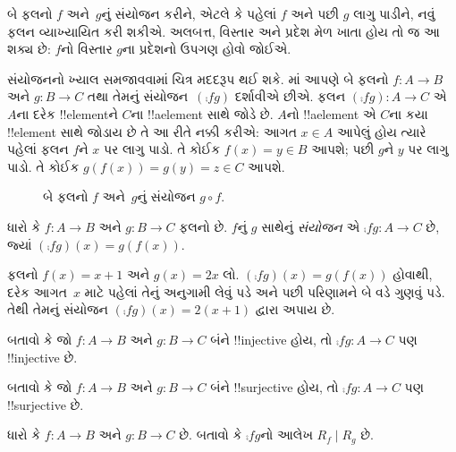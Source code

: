 \documentclass[../../../include/open-logic-section]{subfiles}
\begin{document}

\begin{explain}
 બે ફલનો $f$ અને~$g$નું સંયોજન કરીને,
એટલે કે પહેલાં $f$ અને પછી $g$ લાગુ પાડીને, નવું ફલન
વ્યાખ્યાયિત કરી શકીએ. અલબત્ત, વિસ્તાર અને પ્રદેશ મેળ ખાતા
હોય તો જ આ શક્ય છે: $f$નો વિસ્તાર $g$ના પ્રદેશનો
ઉપગણ હોવો જોઈએ. 

સંયોજનનો ખ્યાલ સમજાવવામાં ચિત્ર મદદરૂપ થઈ શકે.
માં આપણે બે ફલનો
$f \colon A \to B$ અને $g \colon B \to C$
તથા તેમનું સંયોજન~$(\comp{f}{g})$ દર્શાવીએ છીએ.
ફલન $(\comp{f}{g}) \colon A \to C$ એ $A$ના દરેક
!!{element}ને $C$ના !!a{element} સાથે જોડે છે.
$A$નો !!a{element} એ $C$ના કયા !!{element}
સાથે જોડાય છે તે આ રીતે નક્કી કરીએ: આગત $x \in
A$ આપેલું હોય ત્યારે પહેલાં ફલન $f$ને $x$ પર લાગુ પાડો.
તે કોઈક $f(x)
= y \in B$ આપશે; પછી $g$ને $y$ પર લાગુ પાડો.
તે કોઈક $g(f(x)) = g(y) = z \in C$ આપશે.
\begin{figure}
  \caption{બે ફલનો $f$ અને~$g$નું સંયોજન $g \circ f$.}
\end{figure}
\end{explain}

\begin{defn}[સંયોજન]
ધારો કે $f\colon A \to B$ અને $g\colon B \to C$
ફલનો છે. $f$નું $g$ સાથેનું \emph{સંયોજન}
એ $\comp{f}{g} \colon A \to C$ છે, જ્યાં
$(\comp{f}{g})(x) = g(f(x))$.
\end{defn}

\begin{ex}
ફલનો $f(x) = x + 1$ અને $g(x) = 2x$ લો.
$(\comp{f}{g})(x) = g(f(x))$ હોવાથી, દરેક આગત~$x$
માટે પહેલાં તેનું અનુગામી લેવું પડે અને પછી પરિણામને
બે વડે ગુણવું પડે. તેથી તેમનું સંયોજન
$(\comp{f}{g})(x) = 2(x+1)$ દ્વારા અપાય છે.
\end{ex}

\begin{prob}
બતાવો કે જો $f \colon A \to B$ અને $g \colon B \to C$
બંને !!{injective} હોય, તો $\comp{f}{g}\colon A \to C$
પણ !!{injective} છે.
\end{prob}

\begin{prob}
બતાવો કે જો $f \colon A \to B$ અને $g \colon B \to C$
બંને !!{surjective} હોય, તો $\comp{f}{g}\colon A \to C$
પણ !!{surjective} છે.
\end{prob}

\begin{prob}
ધારો કે $f \colon A \to B$ અને $g \colon B \to C$ છે.
બતાવો કે $\comp{f}{g}$નો આલેખ $R_f \mid R_g$ છે.
\end{prob}
\end{document}
